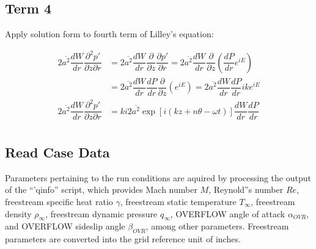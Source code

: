 \documentclass[]{aiaa-tc}%
\begin{document}
\subsection{Term 4}

Apply solution form to fourth term of Lilley's equation:


\begin{equation}
\begin{split}
2\overline{a^2} \dfrac{dW}{dr}\dfrac{\partial^2 p'}{\partial z \partial r}
  &= 2\overline{a^2} \dfrac{dW}{dr} \dfrac{\partial }{\partial z}
    \dfrac{\partial p'}{\partial r}
    = 2\overline{a^2} \dfrac{dW}{dr} \dfrac{\partial }{\partial z}
    \left( \dfrac{dP}{dr} e^{iE} \right) \\
&= 2\overline{a^2} \dfrac{dW}{dr} \dfrac{dP}{dr}
    \dfrac{\partial }{\partial z} \left( e^{iE} \right)
    = 2\overline{a^2} \dfrac{dW}{dr} \dfrac{dP}{dr} ike^{iE}      \\
2\overline{a^2} \dfrac{dW}{dr}\dfrac{\partial^2 p'}{\partial z \partial r}
  &= \boxed{ k i 2\overline{a^2} \exp[i(kz + n\theta -\omega t)] \dfrac{dW}{dr} \dfrac{dP}{dr} } \\
\end{split}
\end{equation}




















\clearpage

\subsection{Read Case Data}

Parameters pertaining to the run conditions are aquired by processing the output of the ``'qinfo'' script, which provides Mach number $M$, Reynold''s number $Re$, freestream specific heat ratio $\gamma$, freestream static temperature $T_{\infty}$, freestream density $\rho_{\infty}$, freestream dynamic pressure $q_{\infty}$, OVERFLOW angle of attack $\alpha_{OVR}$, and OVERFLOW sideslip angle $\beta_{OVR}$, among other parameters.  Freestream parameters are converted into the grid reference unit of inches.
\end{document}

